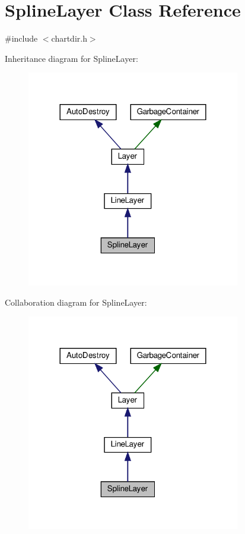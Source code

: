 \hypertarget{class_spline_layer}{}\section{Spline\+Layer Class Reference}
\label{class_spline_layer}


{\ttfamily \#include $<$chartdir.\+h$>$}



Inheritance diagram for Spline\+Layer\+:
\nopagebreak
\begin{figure}[H]
\begin{center}
\leavevmode
\includegraphics[width=264pt]{class_spline_layer__inherit__graph}
\end{center}
\end{figure}


Collaboration diagram for Spline\+Layer\+:
\nopagebreak
\begin{figure}[H]
\begin{center}
\leavevmode
\includegraphics[width=264pt]{class_spline_layer__coll__graph}
\end{center}
\end{figure}
